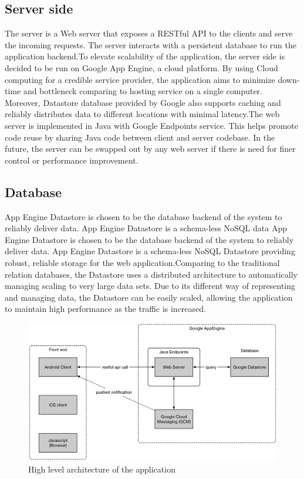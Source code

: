 \subsection{Server side}

The server is a Web server that exposes a RESTful API to the clients and serve the incoming requests. The server
interacts with a persistent database to run the application backend.To elevate scalability of the application, the
server side is decided to be run on Google App Engine, a cloud platform. By using Cloud computing for a credible service
provider, the application aims to minimize down-time and bottleneck comparing to hosting service on a single computer.
Moreover, Datastore database provided by Google also supports caching and reliably distributes data to different
locations with minimal latency.The web server is implemented in Java with Google Endpoints service. This helps promote
code reuse by sharing Java code between client and server codebase. In the future, the server can be swapped out by any
web server if there is need for finer control or performance improvement.

\subsection{Database}

App Engine Datastore is chosen to be the database backend of the system to reliably deliver data. App Engine Datastore
is a schema-less NoSQL data App Engine Datastore is chosen to be the database backend of the system to reliably deliver
data. App Engine Datastore is a schema-less NoSQL Datastore providing robust, reliable storage for the web
application.Comparing to the traditional relation databases, the Datastore uses a distributed architecture to
automatically managing scaling to very large data sets. Due to its different way of representing and managing data, the
Datastore can be easily scaled, allowing the application to maintain high performance as the traffic is increased.

\begin{figure} \includegraphics[width=\textwidth]{Architecture} \caption{High level architecture of the application}
\end{figure}

